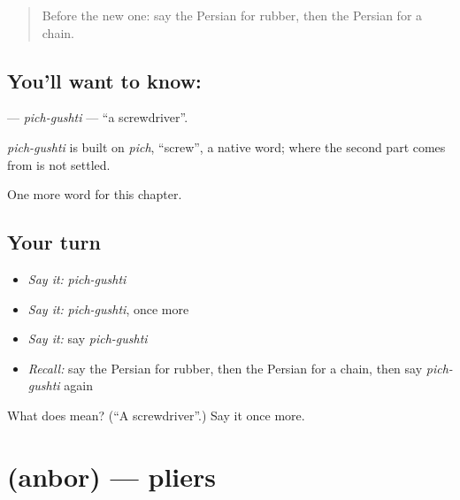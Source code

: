 \label{lesson:FA-C283-pich-gushti}



\begin{quote}
Before the new one: say the Persian for rubber, then the Persian for a chain.
\end{quote}

\subsection*{You'll want to know:  }
\textbf{ } — \emph{pich-gushti} — \textquotedblleft{}a screwdriver\textquotedblright{}.

\begin{cousinweb}
\emph{pich-gushti} is built on \emph{pich}, \textquotedblleft{}screw\textquotedblright{}, a native word; where the second part comes from is not settled.
\end{cousinweb}

\begin{grammarlens}[title={What you've built}]
One more word for this chapter.
\end{grammarlens}

\subsection*{Your turn}
\begin{itemize}
\raggedright
  \item \emph{Say it:} \emph{pich-gushti}
  \item \emph{Say it:} \emph{pich-gushti}, once more
  \item \emph{Say it:} say \emph{pich-gushti}
  \item \emph{Recall:} say the Persian for rubber, then the Persian for a chain, then say \emph{pich-gushti} again
\end{itemize}

\begin{tcolorbox}[breakable,colback=teal!4,colframe=teal!35!black,title={Before you move on}]
What does   mean? (\textquotedblleft{}A screwdriver\textquotedblright{}.) Say it once more.
\end{tcolorbox}
\section[\texorpdfstring{\fa{انبر} (anbor)}{انبر (anbor)}]{ (anbor) — pliers}

\label{lesson:FA-C283-anbor}



